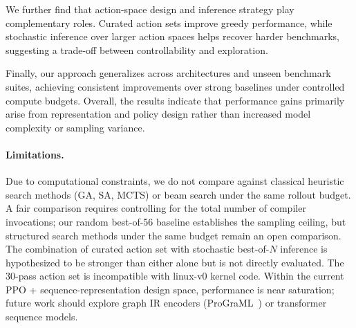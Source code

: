 \documentclass{article}
\begin{document}
We further find that action-space design and inference strategy play complementary roles. Curated action sets improve greedy performance, while stochastic inference over larger action spaces helps recover harder benchmarks, suggesting a trade-off between controllability and exploration.

Finally, our approach generalizes across architectures and unseen benchmark suites, achieving consistent improvements over strong baselines under controlled compute budgets. Overall, the results indicate that performance gains primarily arise from representation and policy design rather than increased model complexity or sampling variance.

\paragraph{Limitations.}
Due to computational constraints, we do not compare against classical heuristic
search methods (GA, SA, MCTS) or beam search under the same rollout budget.
A fair comparison requires controlling for the total number of compiler
invocations; our random best-of-56 baseline establishes the sampling ceiling,
but structured search methods under the same budget remain an open comparison.
The combination of curated action set with stochastic best-of-$N$ inference is
hypothesized to be stronger than either alone but is not directly evaluated.
The 30-pass action set is incompatible with linux-v0 kernel code.  Within the
current PPO + sequence-representation design space, performance is near
saturation; future work should explore graph IR encoders
(ProGraML~\cite{cummins2021programl}) or transformer sequence models.
\end{document}
